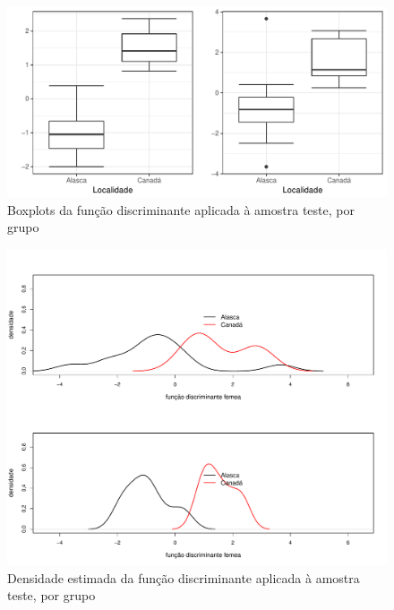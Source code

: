 \documentclass[10pt,portuguese,]{article}
\begin{document}
\vspace{1.5cm}

\begin{figure}[!h]

{\centering \includegraphics{RELATORIO_FINAL_FORMATADO_files/figure-latex/unnamed-chunk-40-1} 

}

\caption{Boxplots da função discriminante aplicada à amostra teste, por grupo}\label{fig:unnamed-chunk-40}
\end{figure}

\begin{figure}[!h]

{\centering \includegraphics{RELATORIO_FINAL_FORMATADO_files/figure-latex/unnamed-chunk-41-1} 

}

\caption{Densidade estimada da função discriminante aplicada à amostra teste, por grupo}\label{fig:unnamed-chunk-41}
\end{figure}
\end{document}
